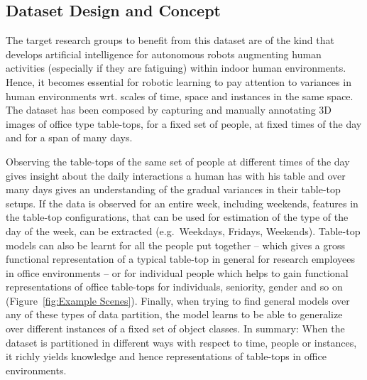 \documentclass[letterpaper, 10 pt, conference]{ieeeconf}  %
\begin{document}
\subsection{Dataset Design and Concept}
\label{ssec:Dataset Design and Concept}
The target research groups to benefit from this dataset are of the kind that develops artificial intelligence for autonomous robots augmenting human activities (especially if they are fatiguing) within indoor human environments. Hence, it becomes essential for robotic learning to pay attention to variances in human environments wrt. scales of time, space and instances in the same space. The dataset has been composed by capturing and manually annotating 3D images of office type table-tops, for a fixed set of people, at fixed times of the day and for a span of many days.

Observing the table-tops of the same set of people at different times of the day gives insight about the daily interactions a human has with his table and over many days gives an understanding of the gradual variances in their table-top setups. If the data is observed for an entire week, including weekends, features in the table-top configurations, that can be used for estimation of the type of the day of the week, can be extracted (e.g.\ Weekdays, Fridays, Weekends). Table-top models can also be learnt for all the people put together -- which gives a gross functional representation of a typical table-top in general for research employees in office environments -- or for individual people which helps to gain functional representations of office table-tops for individuals, seniority, gender and so on (Figure~\ref{fig:Example Scenes}). Finally, when trying to find general models over any of these types of data partition, the model learns to be able to generalize over different instances of a fixed set of object classes. In summary: When the dataset is partitioned in different ways with respect to time, people or instances, it richly yields knowledge and hence representations of table-tops in office environments.
\end{document}
